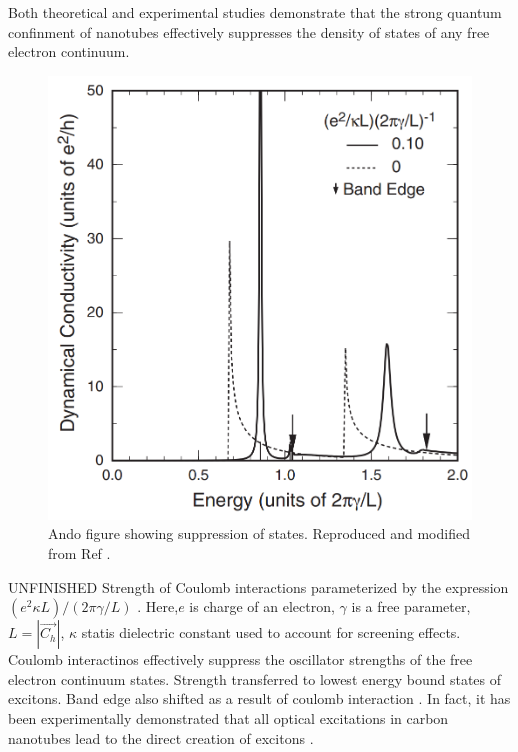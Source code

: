 Both theoretical and experimental studies demonstrate that the strong quantum confinment of nanotubes effectively suppresses the density of states of any free electron continuum.  
 
 \begin{figure}[h]
 	\centering
 	\includegraphics[scale=0.4]{images/chapter_optical_props/ando_suppression}
 	\caption{Ando figure showing suppression of states. Reproduced and modified from Ref \cite{ando2005theory}.}
 	\label{fig:ando_suppression}
 \end{figure}

{\color{red} UNFINISHED} Strength of Coulomb interactions parameterized by the expression $(e^2 \kappa L)/(2 \pi \gamma/L) $ \cite{ando1997excitons}. Here,$e$ is charge of an electron, $\gamma$ is a free parameter, $L = |\vec{C_h} |$, $\kappa$ statis dielectric constant used to account for screening effects. Coulomb interactinos effectively suppress the oscillator strengths of the free electron continuum states. Strength transferred to lowest energy bound states of excitons. Band edge also shifted as a result of coulomb interaction \cite{ando1997excitons}. In fact, it has been experimentally demonstrated that all optical excitations in carbon nanotubes lead to the direct creation of excitons \cite{wang2005optical}. 



